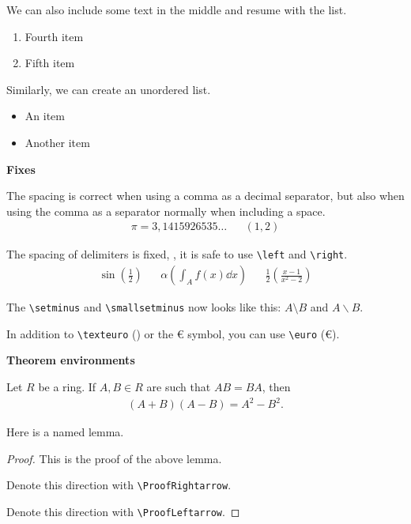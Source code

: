 \documentclass[parskip]{myarticle}
\begin{document}
We can also include some text in the middle and resume with the list.

\begin{enumerate}[resume*]
    \item Fourth item
    \item Fifth item
\end{enumerate}

Similarly, we can create an unordered list.

\begin{itemize}
    \item An item
    \item Another item
\end{itemize}

\textbf{Fixes}

The spacing is correct when using a comma as a decimal separator, but also when using the comma as a separator normally when including a space.
\begin{align*}
    \pi = 3,1415926535\dots && (1, 2)
\end{align*}

The spacing of delimiters is fixed, \ie, it is safe to use \verb|\left| and \verb|\right|.
\begin{align*}
    \sin \left(\frac{1}{2}\right) && \alpha \left( \int_A f(x) \dd x \right) && \frac{1}{2} \left( \frac{x - 1}{x^2 - 2} \right)
\end{align*}

The \verb|\setminus| and \verb|\smallsetminus| now looks like this: $A \setminus B$ and $A \smallsetminus B$.

In addition to \verb|\texteuro| (\texteuro) or the € symbol, you can use \verb|\euro| (\euro).

\textbf{Theorem environments}

\begin{theorem}\label{thm:first}
Let $R$ be a ring. If $A, B \in R$ are such that $AB = BA$, then
\begin{align*}
    (A + B)(A - B) = A^2 - B^2.
\end{align*}
\end{theorem}

\begin{lemma}\label{lem:second}
Here is a named lemma.
\end{lemma}

\begin{proof}
This is the proof of the above lemma.

\ProofRightarrow Denote this direction with \verb|\ProofRightarrow|.

\ProofLeftarrow Denote this direction with \verb|\ProofLeftarrow|.
\end{proof}
\end{document}
